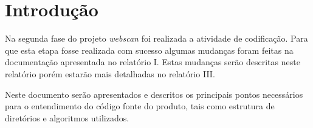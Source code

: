 \section{Introdução}
\label{sec:intro}

Na segunda fase do projeto {\it webscan} foi realizada a atividade de 
codificação. Para que esta etapa fosse realizada com sucesso algumas 
mudanças foram feitas na documentação apresentada no relatório I. 
Estas mudanças serão descritas neste relatório porém estarão mais detalhadas 
no relatório III.

Neste documento serão apresentados e descritos os principais pontos 
necessários para o entendimento do código fonte do produto, 
tais como estrutura de diretórios e algoritmos utilizados.

